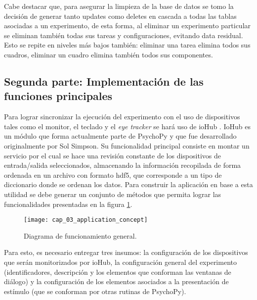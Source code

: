 \documentclass[\main/main.tex]{subfiles}
\begin{document}
		Cabe destacar que, para asegurar la limpieza de la base de datos se tomo la decisión de generar tanto updates como deletes en cascada a todas las tablas asociadas a un experimento, de esta forma, al eliminar un experimento particular se eliminan también todas sus tareas y configuraciones, evitando data residual. Esto se repite en niveles más bajos también: eliminar una tarea elimina todos sus cuadros, eliminar un cuadro elimina también todos sus componentes.  

	\subsection{Segunda parte: Implementación de las funciones principales}
	\label{sub:03_implementacion_backtend}
		Para lograr sincronizar la ejecución del experimento con el uso de dispositivos tales como el monitor, el teclado y el \textit{eye tracker} se hará uso de ioHub \cite{website:iohub}. IoHub es un módulo que forma actualmente parte de PsychoPy y que fue desarrollado originalmente por Sol Simpson. Su funcionalidad principal consiste en montar un servicio por el cual se hace una revisión constante de los dispositivos de entrada/salida seleccionados, almacenando la información recopilada de forma ordenada en un archivo con formato hdf5, que corresponde a un tipo de diccionario donde se ordenan los datos. Para construir la aplicación en base a esta utilidad se debe generar un conjunto de métodos que permita lograr las funcionalidades presentadas en la figura \ref{fig:03_application_concept}. 
		\begin{figure}[H]
			\centering
			\texttt{[image: cap\_03\_application\_concept]}
			\caption{Diagrama de funcionamiento general.}
			\label{fig:03_application_concept}
		\end{figure} 

		Para esto, es necesario entregar tres insumos: la configuración de los dispositivos que serán monitorizados por ioHub, la configuración general del experimento (identificadores, descripción y los elementos que conforman las ventanas de diálogo) y la configuración de los elementos asociados a la presentación de estímulo (que se conforman por otras rutinas de PsychoPy).
\end{document}
